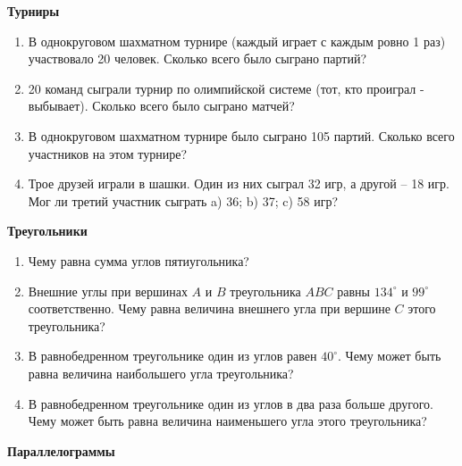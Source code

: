 \documentclass{article}
\begin{document}
\begin{center}
	\textbf{Турниры}
\end{center}

\begin{enumerate}[label*=\protect\fbox{\arabic{enumi}}]
	
	\item В однокруговом шахматном турнире (каждый играет с каждым ровно 1 раз) участвовало 20 человек. Сколько всего было сыграно партий?
	
	\item 20 команд сыграли турнир по олимпийской системе (тот, кто проиграл - выбывает). Сколько всего было сыграно матчей?
	
	\item В однокруговом шахматном турнире было сыграно 105 партий. Сколько всего участников на этом турнире?
	
	\item Трое друзей играли в шашки. Один из них сыграл 32 игр, а другой – 18 игр. Мог ли третий участник сыграть a) 36; b) 37; c) 58 игр?
	
\end{enumerate}


\begin{center}
	\textbf{Треугольники}
\end{center}

\begin{enumerate}[label*=\protect\fbox{\arabic{enumi}}]
	
	\item Чему равна сумма углов пятиугольника?
	
	\item Внешние углы при вершинах $A$ и $B$ треугольника $ABC$ равны $134^\circ$ и $99^\circ$ соответственно. Чему равна величина внешнего угла при вершине $C$ этого треугольника?
	
	\item В равнобедренном треугольнике один из углов равен $40^\circ$. Чему может быть равна величина наибольшего угла треугольника?
	
	\item В равнобедренном треугольнике один из углов в два раза больше другого. Чему может быть равна величина наименьшего угла этого треугольника?
	
\end{enumerate}

\begin{center}
\textbf{Параллелограммы}
\end{center}
\end{document}
